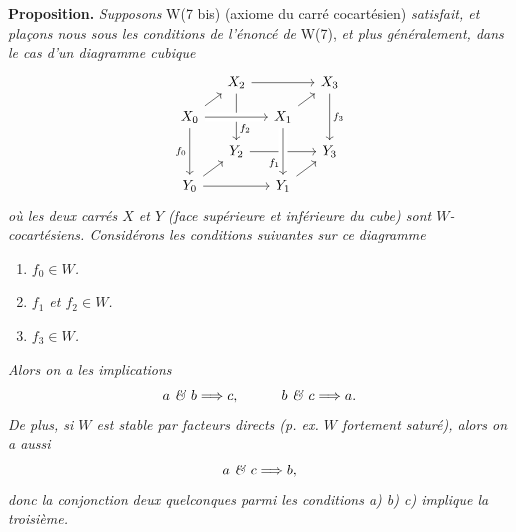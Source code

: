 \textbf{Proposition.} \textit{Supposons} W(7 bis) (axiome du carré cocartésien) \textit{satisfait, et plaçons nous sous les conditions de l'énoncé de} W(7), \textit{et plus généralement, dans le cas d'un diagramme cubique}
\[
\begin{tikzcd}[ampersand replacement=\&, row sep=small, column sep=small]
 \& X_2 \arrow[rr] \arrow[dd, "f_2" near end] \& \& X_3 \arrow[dd, "f_3"] \\
X_0 \arrow[ur] \arrow[rr, crossing over] \arrow[dd, "f_0"'] \& \& X_1 \arrow[ur] \& \\
 \& Y_2 \arrow[rr] \& \& Y_3 \\
Y_0 \arrow[ur] \arrow[rr] \& \& Y_1 \arrow[ur] \arrow[from=uu, crossing over, "f_1"' near end] \&
\end{tikzcd}
\]
\textit{où les deux carrés $X$ et $Y$ (face supérieure et inférieure du cube) sont $W$-cocartésiens. Considérons les conditions suivantes sur ce diagramme}
\begin{enumerate}[label={}]
\item[\textit{a)}] \textit{$f_0 \in W$.}
\item[\textit{b)}] \textit{$f_1$ et $f_2 \in W$.}
\item[\textit{c)}] \textit{$f_3 \in W$.}
\end{enumerate}
\textit{Alors on a les implications}
\[
a \text{ \textit{\&} } b \Longrightarrow c, \qquad\quad b \text{ \textit{\&} } c \Longrightarrow a.
\]
\textit{De plus, si $W$ est stable par facteurs directs (p. ex. $W$ fortement saturé), alors on a aussi}
\[
a \text{ \textit{\&} } c \Longrightarrow b,
\]
\textit{donc la conjonction} \textit{deux quelconques parmi les conditions a) b) c) implique la troisième.}

